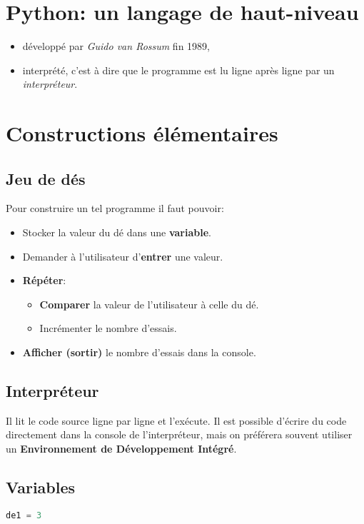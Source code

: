 \documentclass[a4paper,11pt]{article}
\begin{document}
\section{Python: un langage de haut-niveau}

\begin{itemize}
    \item développé par \emph{Guido van Rossum} fin 1989,
    \item interprété, c'est à dire que le programme est lu ligne après ligne par un \emph{interpréteur}.
\end{itemize}
\section{Constructions élémentaires}
\subsection{Jeu de dés}
Pour construire un tel programme il faut pouvoir:
\begin{itemize}
    \item Stocker la valeur du dé dans une \textbf{variable}.
    \item Demander à l'utilisateur d'\textbf{entrer} une valeur.
    \item \textbf{Répéter}:
          \begin{itemize}
              \item \textbf{Comparer} la valeur de l'utilisateur à celle du dé.
              \item Incrémenter le nombre d'essais.
          \end{itemize}
    \item \textbf{Afficher (sortir)} le nombre d'essais dans la console.
\end{itemize}
\subsection{Interpréteur}
Il lit le code source ligne par ligne et l'exécute. Il est possible d'écrire du code directement dans la console de l'interpréteur, mais on préférera souvent utiliser un \textbf{Environnement de Développement Intégré}.
\subsection{Variables}
\begin{center}
\begin{lstlisting}[language=Python  , xleftmargin=2em, xrightmargin=2em]
de1 = 3
\end{lstlisting}
\label{CODE}
\end{center}
\begin{center}
\end{center}
\end{document}
